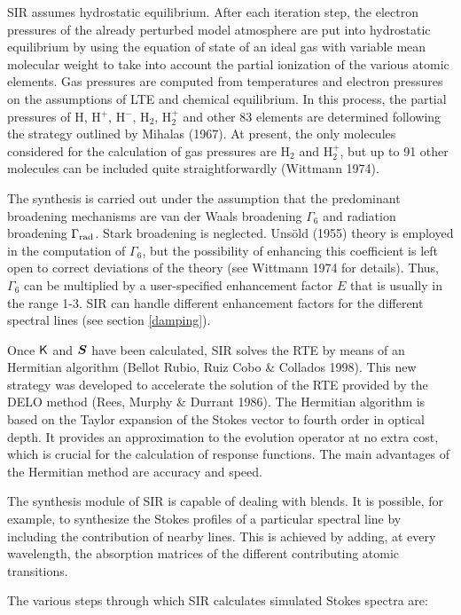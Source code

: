\documentclass[11pt]{report}
\def\vec#1{\mbox{\boldmath $ #1$}}
\def\tens#1{\ifmmode\mathchoice{\mbox{$\sf\displaystyle#1$}}
{\mbox{$\sf\textstyle#1$}}
{\mbox{$\sf\scriptstyle#1$}}
{\mbox{$\sf\scriptscriptstyle#1$}}\else
\hbox{$\sf\textstyle#1$}\fi}
\begin{document}
SIR assumes hydrostatic equilibrium. After each iteration step, the 
electron pressures of the already perturbed model atmosphere are put into 
hydrostatic equilibrium by using the equation of state of
an ideal gas with variable mean molecular weight to take into account
the partial ionization of the various atomic elements. Gas pressures
are computed from temperatures and electron pressures on the
assumptions of LTE and chemical equilibrium. In this process, the
partial pressures of H, H$^+$, H$^-$, H$_2$, H$_2^+$ and other 83
elements  are determined following the strategy outlined by Mihalas
(1967). At present, the only molecules considered for the calculation
of gas pressures are H$_2$ and H$_2^+$, but up to 91 other molecules can
be included quite straightforwardly (Wittmann 1974).

The synthesis is carried out under the assumption that the predominant
broadening mechanisms are van der Waals broadening $\Gamma_6$ and
radiation broadening $\Gamma_{\rm rad}$. Stark broadening is
neglected.  Uns\"old (1955) theory is employed in the computation of
$\Gamma_6$, but the possibility of enhancing this coefficient is left
open to correct deviations of the theory (see Wittmann 1974 for
details). Thus, $\Gamma_6$ can be multiplied by a user-specified
enhancement factor $E$ that is usually in the range 1-3. SIR can handle
different enhancement factors for the different spectral lines (see 
section \ref{damping}).

Once $\tens{K}$ and $\vec{S}$ have been calculated, SIR solves the RTE
by means of an Hermitian algorithm (Bellot Rubio, Ruiz Cobo \& Collados
1998).  This new strategy was developed to accelerate the solution of
the RTE provided by the DELO method (Rees, Murphy \& Durrant 1986). The
Hermitian algorithm is based on the Taylor expansion of the Stokes vector
to fourth order in optical depth. It provides an approximation to the
evolution operator at no extra cost, which is crucial for the calculation
of response functions. The main advantages of the Hermitian method
are accuracy and speed. 

The synthesis module of SIR is capable of dealing with blends. It is
possible, for example, to synthesize the Stokes profiles of a
particular spectral line by including the contribution of nearby
lines.  This is achieved by adding, at every wavelength, the absorption
matrices of the different contributing atomic transitions. 

The various steps through which SIR calculates simulated Stokes spectra 
are:
\end{document}
